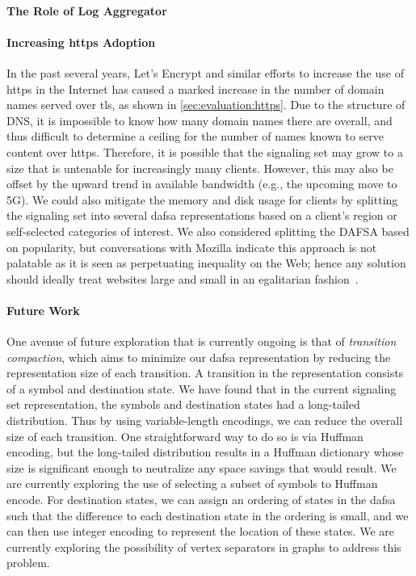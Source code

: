 \paragraph{The Role of Log Aggregator}

\paragraph{Increasing \ac{https} Adoption}

In the past several years, Let's Encrypt and similar efforts to increase
the use of \ac{https} in the Internet has caused a marked increase in the number
of domain names served over \ac{tls}, as shown in
\autoref{sec:evaluation:https}. Due to the structure of DNS, it is impossible to
know how many domain names there are overall, and thus difficult to determine a
ceiling for the number of names known to serve content over \ac{https}.
Therefore, it is possible that the signaling set may grow to a size that is
untenable for increasingly many clients.
However, this may also be offset by the upward trend in available bandwidth
(e.g., the upcoming move to 5G).
We could also mitigate the memory and disk usage for clients by splitting the 
signaling set into several \ac{dafsa} representations based 
on a client's region or self-selected categories of interest.
We also considered splitting the DAFSA based on popularity,
but conversations with Mozilla indicate this approach is not palatable
as it is seen as perpetuating inequality on the Web;
hence any solution should ideally treat websites large and small 
in an egalitarian fashion~\cite{privatecomm}.

\paragraph{Future Work}

One avenue of future exploration that is currently ongoing is that of
\emph{transition compaction}, which aims to minimize our \ac{dafsa}
representation by reducing the representation size of each transition. A
transition in the representation consists of a symbol and destination state. We
have found that in the current signaling set representation, the symbols and
destination states had a long-tailed distribution. Thus by using variable-length
encodings, we can reduce the overall size of each transition. One
straightforward way to do so is via Huffman encoding, but the long-tailed
distribution results in a Huffman dictionary whose size is significant enough to
neutralize any space savings that would result. We are currently exploring the
use of selecting a subset of symbols to Huffman encode. For destination states,
we can assign an ordering of states in the \ac{dafsa} such that the difference
to each destination state in the ordering is small, and we can then use integer encoding to
represent the location of these states. We are currently exploring the
possibility of vertex separators in graphs to address this problem.

